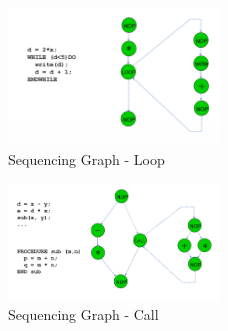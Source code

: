 \begin{figure}[h]
	\begin{center}
		\includegraphics[width=0.5\textwidth]{images/SG_loop.png}
		\caption{Sequencing Graph - Loop}
		\label{fig:SG_loop}
	\end{center}
\end{figure}

\begin{figure}[h]
	\begin{center}
		\includegraphics[width=0.5\textwidth]{images/SG_call.png}
		\caption{Sequencing Graph - Call}
		\label{fig:SG_call}
	\end{center}
\end{figure}